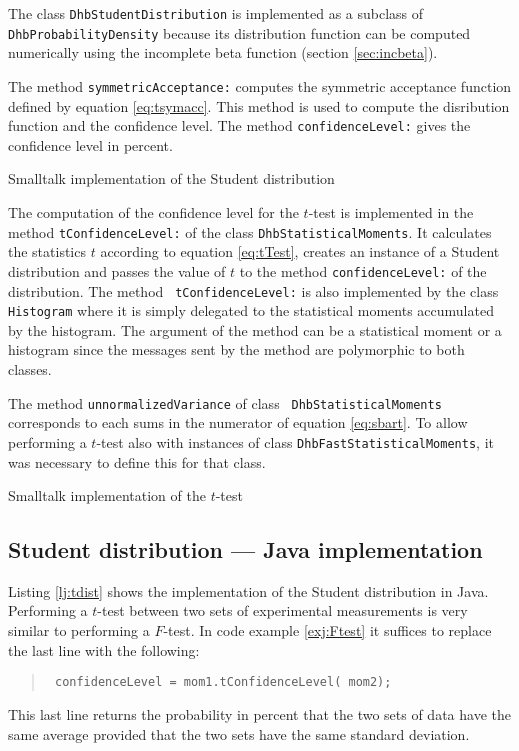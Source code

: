 \documentclass[twoside]{book}
\begin{document}
The class {\tt DhbStudentDistribution} is implemented as a
subclass of {\tt DhbProbabilityDensity} because its distribution
function can be computed numerically using the incomplete beta
function (\cf section \ref{sec:incbeta}).

The method {\tt symmetricAcceptance:} computes the symmetric
acceptance function defined by equation \ref{eq:tsymacc}. This
method is used to compute the disribution function and the
confidence level. The method {\tt confidenceLevel:} gives the
confidence level in percent.
\begin{listing} Smalltalk implementation of the Student distribution \label{ls:tdist}

\end{listing}

The computation of the confidence level for the $t$-test is
implemented in the method {\tt tConfidenceLevel:} of the class
{\tt DhbStatisticalMoments}. It calculates the statistics $t$
according to equation \ref{eq:tTest}, creates an instance of a
Student distribution and passes the value of $t$ to the method
{\tt confidenceLevel:} of the distribution. The method {\tt
tConfidenceLevel:} is also implemented by the class {\tt
Histogram} where it is simply delegated to the statistical moments
accumulated by the histogram. The argument of the method can be a
statistical moment or a histogram since the messages sent by the
method are polymorphic to both classes.

The method {\tt unnormalizedVariance} of class {\tt
DhbStatisticalMoments} corresponds to each sums in the numerator
of equation \ref{eq:sbart}. To allow performing a $t$-test also
with instances of class {\tt DhbFastStatisticalMoments}, it was
necessary to define this for that class.

\begin{listing} Smalltalk implementation of the $t$-test \label{ls:tTest}



\end{listing}

\subsection{Student distribution --- Java implementation}
 Listing \ref{lj:tdist} shows the
implementation of the Student distribution in Java.  Performing a
$t$-test between two sets of experimental measurements is very
similar to performing a $F$-test. In code example \ref{exj:Ftest}
it suffices to replace the last line with the following:
\begin{quote}
\begin{verbatim}
 confidenceLevel = mom1.tConfidenceLevel( mom2);
\end{verbatim}
\end{quote}
This last line returns the probability in percent that the two
sets of data have the same average provided that the two sets have
the same standard deviation.
\end{document}
